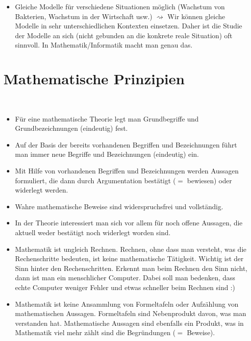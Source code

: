 \begin{bem}
\begin{itemize}
\begin{itemize}
			\item Gleiche Modelle für verschiedene Situationen möglich (Wachstum von Bakterien, Wachstum in der Wirtschaft usw.) $\rightsquigarrow$ Wir können gleiche Modelle in sehr unterschiedlichen Kontexten einsetzen. Daher ist die Studie der Modelle an sich (nicht gebunden an die konkrete reale Situation) oft sinnvoll. In Mathematik/Informatik macht man genau das. 
		\end{itemize} 
	\end{itemize} 
\end{bem}


\section{Mathematische Prinzipien} 

\begin{bem}\ 
	\begin{itemize}
		\item Für eine mathematische Theorie legt man Grundbegriffe und Grundbezeichnungen (eindeutig) fest. 
		\item Auf der Basis der bereits vorhandenen Begriffen und Bezeichnungen führt man immer neue Begriffe und Bezeichnungen (eindeutig) ein. 
		\item Mit Hilfe von vorhandenen Begriffen und Bezeichnungen werden Aussagen formuliert, die dann durch Argumentation bestätigt ($=$ bewiesen) oder widerlegt werden. 
		\item Wahre mathematische Beweise sind widerspruchsfrei und vollständig. 
		\item In der Theorie interessiert man sich vor allem für noch offene Aussagen, die aktuell weder bestätigt noch widerlegt worden sind. 
		\item Mathematik ist ungleich Rechnen. Rechnen, ohne dass man versteht, was die Rechenschritte bedeuten, ist keine mathematische Tätigkeit. Wichtig ist der Sinn hinter den Rechenschritten. Erkennt man beim Rechnen den Sinn nicht, dann ist man ein menschlicher Computer. Dabei soll man bedenken, dass echte Computer  weniger Fehler und  etwas schneller beim Rechnen sind :) 
		\item Mathematik ist keine Ansammlung von Formeltafeln oder Aufzählung von mathematischen Aussagen. Formeltafeln sind Nebenprodukt davon, was man verstanden hat. Mathematische Aussagen sind ebenfalls ein Produkt, was in Mathematik viel mehr zählt sind die Begründungen ($=$ Beweise). 
	\end{itemize} 
\end{bem} 

